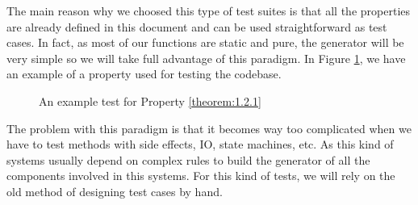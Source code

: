     The main reason why we choosed this type of test suites is that all the
    properties are already defined in this document and can be used
    straightforward as test cases. In fact, as most of our functions
    are static and pure, the generator will be very simple so we will take full
    advantage of this paradigm. In Figure \ref{test_example}, we have an example
    of a property used for testing the codebase.\\

    \begin{figure}[ht!]
      \caption{An example test for Property \ref{theorem:1.2.1}}
      \label{test_example}
    \end{figure}

    The problem with this paradigm is that it becomes way too complicated when
    we have to test methods with side effects, IO, state machines, etc. As this
    kind of systems usually depend on complex rules to build the generator of
    all the components involved in this systems. For this kind of tests, we
    will rely on the old method of designing test cases by hand.\\
